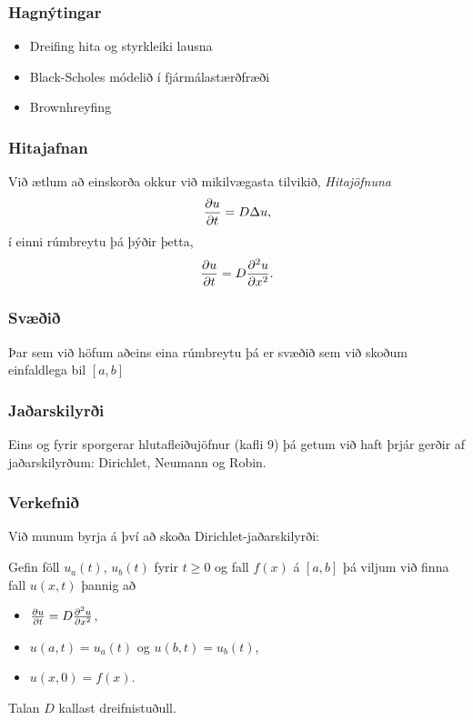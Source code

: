 \documentclass[icelandic,a4paper,12pt]{article}
\begin{document}
 \subsubsection{Hagnýtingar}
 \begin{itemize}
  \item Dreifing hita og styrkleiki lausna
  \item Black-Scholes módelið í fjármálastærðfræði
  \item Brownhreyfing
 \end{itemize}
 
 
 \pause
 
 \subsubsection{Hitajafnan}
 Við ætlum að einskorða okkur við mikilvægasta tilvikið, \emph{Hitajöfnuna}
 $$
  \frac{{\partial} u}{{\partial} t} =  D \Delta u,
 $$\pause
 í einni rúmbreytu þá þýðir þetta, 
 $$
  \frac{{\partial} u}{{\partial} t} =  D\frac{{\partial}^2 u}{{\partial} x^2}.
 $$
 



\subsubsection{Svæðið}
 Þar sem við höfum aðeins eina rúmbreytu þá er svæðið sem við skoðum 
 einfaldlega bil $[a,b]$

  
\subsubsection{Jaðarskilyrði}
 Eins og fyrir sporgerar hlutafleiðujöfnur (kafli 9) þá getum við haft þrjár gerðir
 af jaðarskilyrðum: Dirichlet,
 Neumann og  Robin.


\subsubsection{Verkefnið}
Við munum byrja á því að skoða Dirichlet-jaðarskilyrði: \pause 

Gefin föll
$u_a(t)$, $u_b(t)$ fyrir $t\geq 0$ og fall $f(x)$ á $[a,b]$ þá viljum
við finna fall $u(x,t)$ þannig að \pause
\begin{itemize}
 \item $\frac{{\partial} u}{{\partial} t} =  D \frac{{\partial}^2 u}{{\partial} x^2}$, \pause
 \item $u(a,t) = u_a(t)$ og $u(b,t) = u_b(t)$, \pause
 \item $u(x,0) = f(x)$. \pause
\end{itemize}
Talan $D$ kallast dreifnistuðull.
\end{document}

